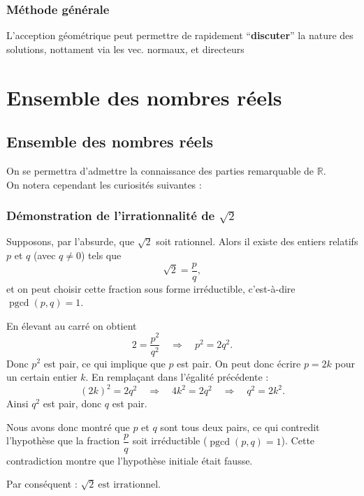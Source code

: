 \documentclass{report}
\newcommand{\R}{\mathbb{R}}
\newcommand{\pgcd}{\operatorname{pgcd}}
\begin{document}
    \subsubsection{Méthode générale}

      L'acception géométrique peut permettre de rapidement ``\textbf{discuter}'' la nature des solutions, nottament via les vec. normaux, et directeurs


  \section{Ensemble des nombres réels}

    \subsection{Ensemble des nombres réels}

      On se permettra d'admettre la connaissance des parties remarquable de $\R$. \\
      On notera cependant les curiosités suivantes : 

      \subsubsection{Démonstration de l'irrationnalité de $\sqrt{2}$}

      \begin{tcolorbox}[colback=white, colframe=black, boxrule=0.8pt, width=1\textwidth]

        Supposons, par l'absurde, que \(\sqrt{2}\) soit rationnel. Alors il existe des entiers relatifs \(p\) et \(q\) (avec \(q\neq0\)) tels que
        \[
        \sqrt{2}=\frac{p}{q},
        \]
        et on peut choisir cette fraction sous forme irréductible, c'est-à-dire \(\pgcd(p,q)=1\).

        En élevant au carré on obtient
        \[
        2=\frac{p^2}{q^2}\quad\Longrightarrow\quad p^2=2q^2.
        \]
        Donc \(p^2\) est pair, ce qui implique que \(p\) est pair. On peut donc écrire \(p=2k\) pour un certain entier \(k\). En remplaçant dans l'égalité précédente :
        \[
        (2k)^2=2q^2 \quad\Longrightarrow\quad 4k^2=2q^2 \quad\Longrightarrow\quad q^2=2k^2.
        \]
        Ainsi \(q^2\) est pair, donc \(q\) est pair.

        Nous avons donc montré que \(p\) et \(q\) sont tous deux pairs, ce qui contredit l'hypothèse que la fraction \(\dfrac{p}{q}\) soit irréductible (\(\pgcd(p,q)=1\)). Cette contradiction montre que l'hypothèse initiale était fausse.

        Par conséquent : \(\boxed{\sqrt{2}\ \text{est irrationnel}.}\)

      \end{tcolorbox}
\end{document}
